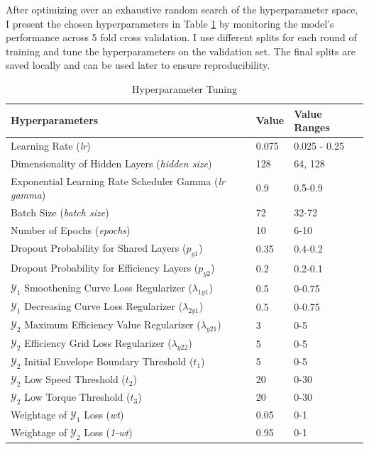 \documentclass{report} %
\begin{document}
After optimizing over an exhaustive random search of the hyperparameter space, I present the chosen hyperparameters in Table \ref{tab:Hyperparameter Tunings} by 
monitoring the model's performance across 5 fold cross validation. I use different splits for each round of training and tune the hyperparameters on the validation set. 
The final splits are saved locally and can be used later to ensure reproducibility. 

\begin{table}[H]
    \centering
    \begin{tabularx}{\linewidth}{|p{}|p{}|p{}|}
    \hline {\bf Hyperparameters} & {\bf Value} & {\bf Value Ranges}\\
    \hline 
    Learning Rate (\textit{lr}) & 0.075 & 0.025 - 0.25\\
    Dimensionality of Hidden Layers (\textit{hidden size})& 128 & 64, 128\\
    Exponential Learning Rate Scheduler Gamma (\textit{lr gamma})& 0.9 & 0.5-0.9\\
    Batch Size (\textit{batch size})& 72 & 32-72\\
    Number of Epochs (\textit{epochs})& 10 & 6-10\\
    Dropout Probability for Shared Layers (\textit{$p_{y1}$})& 0.35 & 0.4-0.2\\
    Dropout Probability for Efficiency Layers (\textit{$p_{y2}$}) & 0.2 & 0.2-0.1\\
    $\mathcal{Y}_1$ Smoothening Curve Loss Regularizer (\textit{$\lambda_{1y1}$}) & 0.5 & 0-0.75\\
    $\mathcal{Y}_1$ Decreasing Curve Loss Regularizer (\textit{$\lambda_{2y1}$})& 0.5 & 0-0.75\\
    $\mathcal{Y}_2$ Maximum Efficiency Value Regularizer (\textit{$\lambda_{y21}$})& 3 & 0-5\\
    $\mathcal{Y}_2$ Efficiency Grid Loss Regularizer (\textit{$\lambda_{y22}$}) & 5 & 0-5\\
    $\mathcal{Y}_2$ Initial Envelope Boundary Threshold (\textit{$t_{1}$})& 5 & 0-5\\
    $\mathcal{Y}_2$ Low Speed Threshold (\textit{$t_{2}$})& 20 & 0-30\\
    $\mathcal{Y}_2$ Low Torque Threshold (\textit{$t_{3}$})& 20 & 0-30\\
    Weightage of $\mathcal{Y}_1$ Loss (\textit{wt})& 0.05 & 0-1\\
    Weightage of $\mathcal{Y}_2$ Loss (\textit{1-wt})& 0.95 & 0-1\\
    \hline
    \end{tabularx}
    \caption{Hyperparameter Tuning}
    \label{tab:Hyperparameter Tunings}
\end{table}
\end{document}
